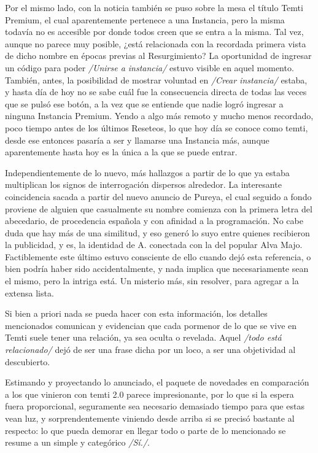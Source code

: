 \documentclass[
  spanish,
]{book}
\begin{document}
Por el mismo lado, con la noticia también se puso sobre la mesa el título Temti Premium, el cual aparentemente pertenece a una Instancia, pero la misma todavía no es accesible por donde todos creen que se entra a la misma. Tal vez, aunque no parece muy posible, ¿está relacionada con la recordada primera vista de dicho nombre en épocas previas al Resurgimiento? La oportunidad de ingresar un código para poder \emph{/Unirse a instancia/} estuvo visible en aquel momento. También, antes, la posibilidad de mostrar voluntad en \emph{/Crear instancia/} estaba, y hasta día de hoy no se sabe cuál fue la consecuencia directa de todas las veces que se pulsó ese botón, a la vez que se entiende que nadie logró ingresar a ninguna Instancia Premium. Yendo a algo más remoto y mucho menos recordado, poco tiempo antes de los últimos Reseteos, lo que hoy día se conoce como temti, desde ese entonces pasaría a ser y llamarse una Instancia más, aunque aparentemente hasta hoy es la única a la que se puede entrar.

Independientemente de lo nuevo, más hallazgos a partir de lo que ya estaba multiplican los signos de interrogación dispersos alrededor. La interesante coincidencia sacada a partir del nuevo anuncio de Pureya, el cual seguido a fondo proviene de alguien que casualmente su nombre comienza con la primera letra del abecedario, de procedencia española y con afinidad a la programación. No cabe duda que hay más de una similitud, y eso generó lo suyo entre quienes recibieron la publicidad, y es, la identidad de A. conectada con la del popular Alva Majo. Factiblemente este último estuvo consciente de ello cuando dejó esta referencia, o bien podría haber sido accidentalmente, y nada implica que necesariamente sean el mismo, pero la intriga está. Un misterio más, sin resolver, para agregar a la extensa lista.

Si bien a priori nada se pueda hacer con esta información, los detalles mencionados comunican y evidencian que cada pormenor de lo que se vive en Temti suele tener una relación, ya sea oculta o revelada. Aquel \emph{/todo está relacionado/} dejó de ser una frase dicha por un loco, a ser una objetividad al descubierto.

Estimando y proyectando lo anunciado, el paquete de novedades en comparación a los que vinieron con temti 2.0 parece impresionante, por lo que si la espera fuera proporcional, seguramente sea necesario demasiado tiempo para que estas vean luz, y sorprendentemente viniendo desde arriba si se precisó bastante al respecto: lo que pueda demorar en llegar todo o parte de lo mencionado se resume a un simple y categórico \emph{/Sí./}.
\end{document}
